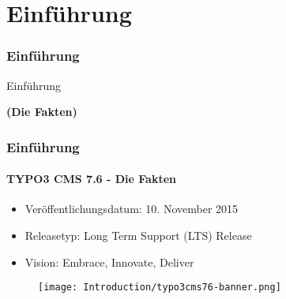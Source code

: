 %

\section{Einführung}
\begin{frame}[fragile]
	\frametitle{Einführung}

	\begin{center}\huge{Einführung}\end{center}
	\begin{center}\huge{\color{typo3darkgrey}\textbf{(Die Fakten)}}\end{center}

\end{frame}

\begin{frame}[fragile]
	\frametitle{Einführung}
	\framesubtitle{TYPO3 CMS 7.6 - Die Fakten}

	\begin{itemize}
		\item Veröffentlichungsdatum: 10. November 2015
		\item Releasetyp: Long Term Support (LTS) Release
		\item Vision: Embrace, Innovate, Deliver
	\end{itemize}

	\begin{figure}
		\texttt{[image: Introduction/typo3cms76-banner.png]}
	\end{figure}

\end{frame}

